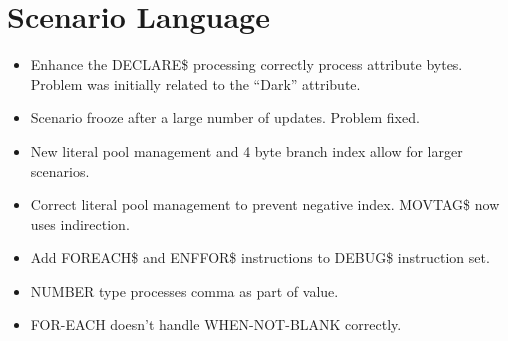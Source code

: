 \documentclass[letterpaper,10pt,english]{sphinxmanual}
\begin{document}
\newpage


\section{Scenario Language}
\label{\detokenize{TN201902:scenario-language}}
\begin{itemize}
\item {} 
Enhance the DECLARE\$ processing correctly process attribute bytes. Problem was initially related to the “Dark” attribute.

\end{itemize}

\begin{itemize}
\item {} 
Scenario frooze after a large number of updates. Problem fixed.

\end{itemize}

\begin{itemize}
\item {} 
New literal pool management and 4 byte branch index allow for larger scenarios.

\end{itemize}

\begin{itemize}
\item {} 
Correct literal pool management to prevent negative index. MOVTAG\$ now uses indirection.

\end{itemize}

\begin{itemize}
\item {} 
Add FOREACH\$ and ENFFOR\$ instructions to DEBUG\$ instruction set.

\end{itemize}

\begin{itemize}
\item {} 
NUMBER type processes comma as part of value.

\end{itemize}

\begin{itemize}
\item {} 
FOR-EACH doesn’t handle WHEN-NOT-BLANK correctly.

\end{itemize}
\end{document}
